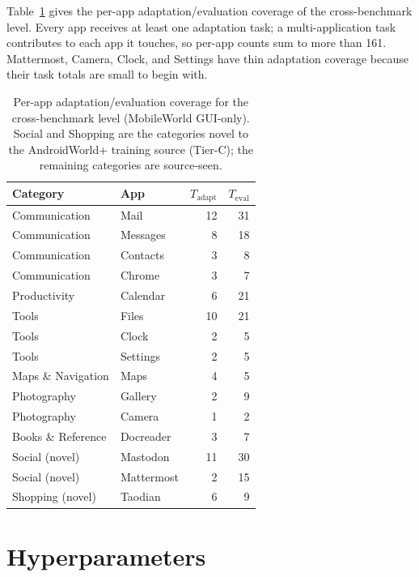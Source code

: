 Table~\ref{tab:mw-coverage} gives the per-app adaptation/evaluation coverage of
the cross-benchmark level. Every app receives at least one adaptation task; a
multi-application task contributes to each app it touches, so per-app counts sum
to more than 161. Mattermost, Camera, Clock, and Settings have thin adaptation
coverage because their task totals are small to begin with.

\begin{table}[t]
\small
\centering
\begin{tabular}{llrr}
\hline
\textbf{Category} & \textbf{App} & \textbf{$T_{\text{adapt}}$} & \textbf{$T_{\text{eval}}$} \\
\hline
Communication      & Mail        & 12 & 31 \\
Communication      & Messages    &  8 & 18 \\
Communication      & Contacts    &  3 &  8 \\
Communication      & Chrome      &  3 &  7 \\
Productivity       & Calendar    &  6 & 21 \\
Tools              & Files       & 10 & 21 \\
Tools              & Clock       &  2 &  5 \\
Tools              & Settings    &  2 &  5 \\
Maps \& Navigation & Maps        &  4 &  5 \\
Photography        & Gallery     &  2 &  9 \\
Photography        & Camera      &  1 &  2 \\
Books \& Reference & Docreader   &  3 &  7 \\
Social (novel)     & Mastodon    & 11 & 30 \\
Social (novel)     & Mattermost  &  2 & 15 \\
Shopping (novel)   & Taodian     &  6 &  9 \\
\hline
\end{tabular}
\caption{Per-app adaptation/evaluation coverage for the cross-benchmark level
(MobileWorld GUI-only). Social and Shopping are the categories novel to the
AndroidWorld+ training source (Tier-C); the remaining categories are
source-seen.}
\label{tab:mw-coverage}
\end{table}

\section{Hyperparameters}
\label{app:hyper}

